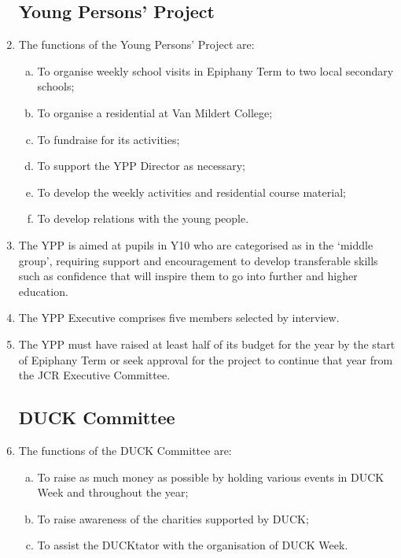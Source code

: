 \documentclass[12pt]{article}  %
\begin{document}
\begin{enumerate}
    \subsection{Young Persons’ Project}
    \item The functions of the Young Persons’ Project are:
    \begin{enumerate}[(a)]
        \item To organise weekly school visits in Epiphany Term to two local secondary schools;
        \item To organise a residential at Van Mildert College;
        \item To fundraise for its activities;
        \item To support the YPP Director as necessary;
        \item To develop the weekly activities and residential course material;
        \item To develop relations with the young people.
    \end{enumerate}
    \item The YPP is aimed at pupils in Y10 who are categorised as in the ‘middle group’, requiring support and encouragement to develop transferable skills such as confidence that will inspire them to go into further and higher education.
    \item The YPP Executive comprises five members selected by interview.
    \item The YPP must have raised at least half of its budget for the year by the start of Epiphany Term or seek approval for the project to continue that year from the JCR Executive Committee.
    \subsection{DUCK Committee}
    \item The functions of the DUCK Committee are:
    \begin{enumerate}[(a)]
        \item To raise as much money as possible by holding various events in DUCK Week and throughout the year;
        \item To raise awareness of the charities supported by DUCK;
        \item To assist the DUCKtator with the organisation of DUCK Week.
    \end{enumerate}

\end{enumerate}
\end{document}
